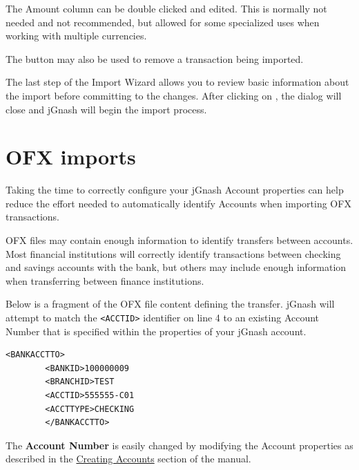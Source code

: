 \documentclass[letterpaper,12pt]{book}
\begin{document}
    The Amount column can be double clicked and edited. This is normally not
    needed and not recommended, but allowed for some specialized uses when working
    with multiple currencies.

    The  button may also be used to remove a transaction being imported.


    The last step of the Import Wizard allows you to review basic information about
    the import before committing to the changes. After clicking on ,
    the dialog will close and jGnash will begin the import process.

    \section{OFX imports}
    Taking the time to correctly configure your jGnash Account properties can help
    reduce the effort needed to automatically identify Accounts when importing OFX
    transactions.

    OFX files may contain enough information to identify transfers between accounts.
    Most financial institutions will correctly identify transactions between checking
    and savings accounts with the bank, but others may include enough information
    when transferring between finance institutions.

    Below is a fragment of the OFX file content defining the transfer. jGnash will
    attempt to match the \texttt{<ACCTID>} identifier on line 4 to an existing Account Number
    that is specified within the properties of your jGnash account.
    \\ %
    \begin{lstlisting}[caption={OFX File Fragment}]
        <BANKACCTTO>
        <BANKID>100000009
        <BRANCHID>TEST
        <ACCTID>555555-C01
        <ACCTTYPE>CHECKING
        </BANKACCTTO>
    \end{lstlisting}

    The \textbf{Account Number} is easily changed by modifying the Account properties as described
    in the \hyperref[subsec:creatingAccounts]{Creating Accounts} section of the manual.
\end{document}
